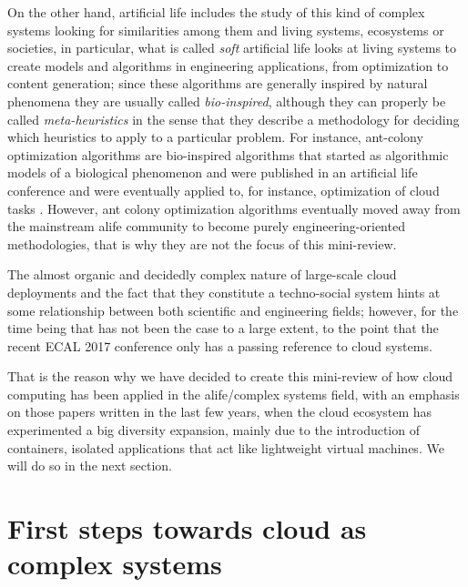 \documentclass[utf8]{frontiersSCNS} %
\begin{document}
On the other hand, artificial life \citep{wiki:alife} includes the
study of this kind of complex systems looking for similarities among
them and living systems, ecosystems or societies, in particular, what
is called {\em soft} artificial life looks at living systems to create
models and algorithms in engineering applications, from optimization
to content generation; since these algorithms are generally inspired
by natural phenomena they are usually called {\em bio-inspired},
although they can properly be called {\em meta-heuristics} in the
sense that they describe a methodology for deciding which heuristics
to apply to a particular problem. For instance, ant-colony
optimization algorithms are bio-inspired algorithms that started as
algorithmic models of a biological phenomenon and were published in an
artificial life conference \citep{deneubourg1991dynamics} and were
eventually applied to, for instance, optimization of cloud tasks
\citep{li2011cloud}. However, ant colony optimization algorithms
eventually moved away from the mainstream alife community to become
purely engineering-oriented methodologies, that is why they are not
the focus of this mini-review. 


The almost organic and decidedly complex nature
of large-scale cloud deployments and the fact that they constitute a
techno-social system \citep{vespignani2009predicting,JJ2016} hints at 
some relationship between both scientific and engineering fields; however,
for the time being that has not been the case to a large extent, to the point
that the recent ECAL 2017 conference \citep{ecal17} only has a passing reference to cloud systems.

That is the reason why we have decided to create this
mini-review of how cloud computing has been applied in the
alife/complex systems field, with an emphasis on those papers written
in the last few years, when the cloud ecosystem has experimented a big
diversity expansion, mainly due to the introduction of containers,
isolated applications that act like lightweight virtual machines. We
will do so in the next section.

\section{First steps towards cloud as complex systems}
\end{document}
